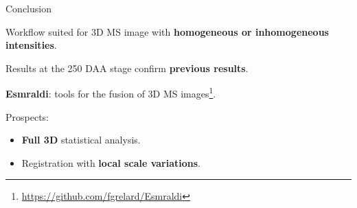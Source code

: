 \documentclass[10pt]{beamer}
\begin{document}
\begin{frame}{Conclusion}

  Workflow suited for 3D MS image with \textbf{homogeneous or inhomogeneous intensities}.

  Results at the 250 DAA stage confirm \textbf{previous results}.

  \textbf{Esmraldi}: tools for the fusion of 3D MS images\footnote{\url{https://github.com/fgrelard/Esmraldi}}.


  \vspace{0.4cm}

  Prospects:
  \begin{itemize}
  \item \textbf{Full 3D} statistical analysis.
  \item Registration with \textbf{local scale variations}.
  \end{itemize}


\end{frame}
\end{document}
